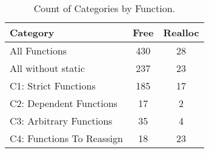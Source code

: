 \begin{table}[H]
   \begin{center}
   \begin{tabularx}{0.6\linewidth}{l|c|c}

      Category & Free & Realloc \\
      \hline

      All Functions& 430 & 28 \\

      All without static& 237 & 23 \\

      C1: Strict Functions& 185 & 17 \\

      C2: Dependent Functions& 17 & 2 \\

      C3: Arbitrary Functions& 35 & 4 \\

      C4: Functions To Reassign& 18 & 23 \\

   \end{tabularx}
\end{center}
   \caption{Count of Categories by Function.}
   \label{tab:categories:overview}
\end{table}

